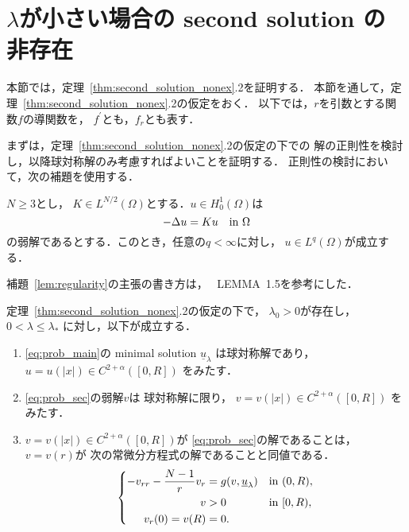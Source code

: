 \section{$\lambda$が小さい場合の second solution の非存在}
\label{sec:sym}

本節では，定理~\ref{thm:second_solution_nonex}.2を証明する．
本節を通して，定理~\ref{thm:second_solution_nonex}.2の仮定をおく．
以下では，$r$を引数とする関数$f$の導関数を，
$f^\prime$とも，$f_r$とも表す．

まずは，定理~\ref{thm:second_solution_nonex}.2の仮定の下での
解の正則性を検討し，以降球対称解のみ考慮すればよいことを証明する．
正則性の検討において，次の補題を使用する．

\begin{lem}[\cite{MR539217}] 
 \label{lem:regularity}
 $N \geq 3$とし，
 $K \in L^{N/2}(\Omega)$とする．$u \in H_0^1(\Omega)$は
 \[
  - \Delta u = K u \ \ ~\text{in}~ \Omega
 \]
 の弱解であるとする．このとき，任意の$q < \infty$に対し，
 $u \in L^q(\Omega)$が成立する．
\end{lem}

補題~\ref{lem:regularity}の主張の書き方は，
\cite{MR709644}~LEMMA~1.5を参考にした．

\begin{lem} \label{lem:reg_rad}
 定理~\ref{thm:second_solution_nonex}.2の仮定の下で，
 $\lambda_0 > 0$が存在し，$0 < \lambda \leq \lambda_*$
 に対し，以下が成立する．
 \begin{enumerate}[1.] \sage
  \item \ref{eq:prob_main}の minimal solution $\underline{u}_\lambda$
        は球対称解であり，
        $u = u(\lvert x \rvert)
        \in C^{2+\alpha}([0, R])$
        をみたす．
  \item \ref{eq:prob_sec}の弱解$v$は
        球対称解に限り，
        $v = v(\lvert x \rvert)
        \in C^{2+\alpha}([0, R])$
        をみたす．
  \item $v = v(\lvert x \rvert) \in C^{2+\alpha}([0, R])$が
        \ref{eq:prob_sec}の解であることは，
        $v = v(r)$が
        次の常微分方程式の解であることと同値である．
        \begin{align}
         \left\{
          \begin{aligned}
           -v_{rr} - \frac{N-1}{r}v_r  &= g(v, \underline{u}_\lambda)
           & &\text{in}~ (0, R),  \\
           v &> 0 & &\text{in}~ [0, R), \\
           v_r(0) = v(R) &= 0.  & &
          \end{aligned}
         \right. \label{eq:prob_rad}
        \end{align}
 \end{enumerate}
\end{lem}

